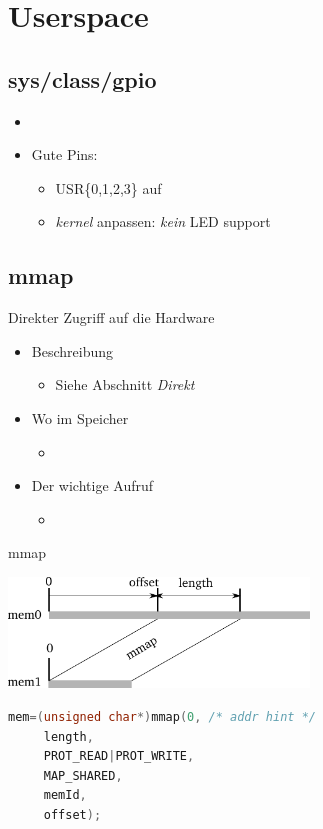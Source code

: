 \section{Userspace}
\subsection{sys/class/gpio}
\begin{frame}{}
 \begin{itemize}
  \item {}
  \item Gute Pins:
  \begin{itemize}
   \item USR\{0,1,2,3\} auf 
   \item {\em kernel} anpassen: {\em kein} LED support
  \end{itemize}
 \end{itemize}
\end{frame}

\subsection{mmap}
\begin{frame}{}{Direkter Zugriff auf die Hardware}
 \begin{itemize}
  \item Beschreibung
   \begin{itemize}
    \item Siehe Abschnitt {\em Direkt}
   \end{itemize}
  \item Wo im Speicher
   \begin{itemize}
    \item {}
   \end{itemize}
 \item Der wichtige Aufruf
  \begin{itemize}
   \item {}
  \end{itemize}
 \end{itemize}
\end{frame}

\begin{frame}[fragile]{mmap}
\begin{center}
 \includegraphics[width=8cm]{mmap.pdf}
\end{center}
\begin{lstlisting}[language=C]
 mem=(unsigned char*)mmap(0, /* addr hint */
     length,
     PROT_READ|PROT_WRITE,
     MAP_SHARED, 
     memId,
     offset);
\end{lstlisting}
\end{frame}

